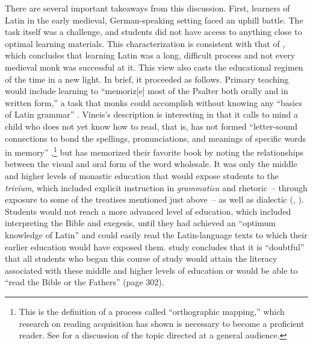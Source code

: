 There are several important takeaways from this discussion. First, learners of Latin in the early medieval, German-speaking setting faced an uphill battle. The task itself was a challenge, and students did not have access to anything close to optimal learning materials. This characterization is consistent with that of \citet[296]{Barrau2011}, which concludes that learning Latin was a long, difficult process and not every medieval monk was successful at it. This view also casts the educational regimen of the time in a new light. In brief, it proceeded as follows. Primary teaching would include learning to “memoriz[e] most of the Psalter both orally and in written form,” a task that monks could accomplish without knowing any “basics of Latin grammar” \citep[139]{Vineis1994}. Vineis’s description is interesting in that it calls to mind a child who does not yet know how to read, that is, has not formed “letter-sound connections to bond the spellings, pronunciations, and meanings of specific words in memory” \citep[5]{Ehri2014},\footnote{This is the definition of a process called “orthographic mapping,” which research on reading acquisition has shown is necessary to become a proficient reader. See \citet{Seidenberg2018} for a discussion of the topic directed at a general audience.} but has memorized their favorite book by noting the relationships between the visual and oral form of the word wholesale. It was only the middle and higher levels of monastic education that would expose students to the \textit{trivium}, which included explicit instruction in \textit{grammatica} and rhetoric~-- through exposure to some of the treatises mentioned just above~-- as well as dialectic (\citealt[139]{Vineis1994}, \citealt[37]{Brown1994}). Students would not reach a more advanced level of education, which included interpreting the Bible and exegesis, until they had achieved an “optimum knowledge of Latin” and could easily read the Latin-language texts to which their earlier education would have exposed them.  study concludes that it is “doubtful” that all students who began this course of study would attain the literacy associated with these middle and higher levels of education or would be able to “read the Bible or the Fathers” (page 302).\largerpage

